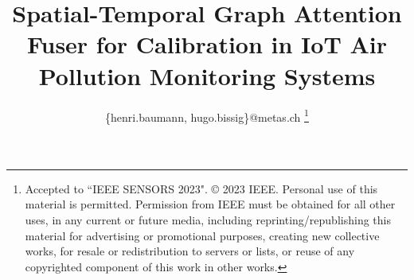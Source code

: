 \documentclass[conference,a4paper]{IEEEtran}
\begin{document}
\title{Spatial-Temporal Graph Attention Fuser for Calibration in IoT Air Pollution Monitoring Systems\\

}
\author{
    \{henri.baumann, hugo.bissig\}@metas.ch
    \thanks{Accepted to ``IEEE SENSORS 2023". © 2023 IEEE.  Personal use of this material is permitted.  Permission from IEEE must be obtained for all other uses, in any current or future media, including reprinting/republishing this material for advertising or promotional purposes, creating new collective works, for resale or redistribution to servers or lists, or reuse of any copyrighted component of this work in other works.}
    }
    



\maketitle
\end{document}

